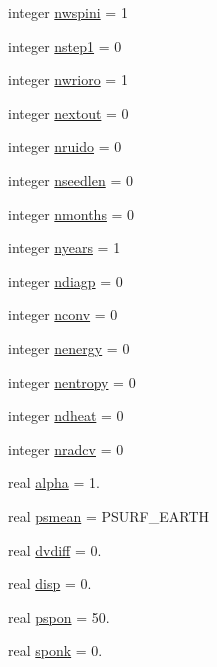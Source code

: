 \begin{DoxyCompactItemize}
\item 
integer \hyperlink{classpumamod_ae565fd4c9d0d1e8f563b457690df60e1}{nwspini} = 1
\item 
integer \hyperlink{classpumamod_a44f4e89edb1112fb56a0acd8fe2de68c}{nstep1} = 0
\item 
integer \hyperlink{classpumamod_aeed68a00c7949544bc4fef6fb12750e7}{nwrioro} = 1
\item 
integer \hyperlink{classpumamod_ac8490b47e54184cb4a1cea076d0a30a3}{nextout} = 0
\item 
integer \hyperlink{classpumamod_a8f8ac2af640bb3457498cf2ca2cf382a}{nruido} = 0
\item 
integer \hyperlink{classpumamod_af9d1e5f558a9b0151f81e27c4ea6c361}{nseedlen} = 0
\item 
integer \hyperlink{classpumamod_a5deccef8dbe1e1e9bfb869f67d8a16f1}{nmonths} = 0
\item 
integer \hyperlink{classpumamod_a6bebc837456862a7db9c50bcd686e1e6}{nyears} = 1
\item 
integer \hyperlink{classpumamod_a996f9145950ee7b3955819b122de4957}{ndiagp} = 0
\item 
integer \hyperlink{classpumamod_a4ad70fab2e818be277ec41afde36c5d2}{nconv} = 0
\item 
integer \hyperlink{classpumamod_a0423d8412d0d82630764dd724fbe763a}{nenergy} = 0
\item 
integer \hyperlink{classpumamod_a6ebc03f03149556f450c2c2c927189f2}{nentropy} = 0
\item 
integer \hyperlink{classpumamod_a8e7c1d42543d35f7caba5ebd36dcfd54}{ndheat} = 0
\item 
integer \hyperlink{classpumamod_a5e7e19a6f3a971a303fc7efc2676e5f1}{nradcv} = 0
\item 
real \hyperlink{classpumamod_a976863e22669d1d80cb62a3af35e3d4d}{alpha} = 1.
\item 
real \hyperlink{classpumamod_ac68939034981424cca40dd948549d1a0}{psmean} = \-P\-S\-U\-R\-F\-\_\-\-E\-A\-R\-T\-H
\item 
real \hyperlink{classpumamod_a529184e9404faf138c07e7f28afee2e1}{dvdiff} = 0.
\item 
real \hyperlink{classpumamod_a4fc16343d9407e3714e301309177a08a}{disp} = 0.
\item 
real \hyperlink{classpumamod_a594702993f401d2641f71890a8f9f6f5}{pspon} = 50.
\item 
real \hyperlink{classpumamod_ad1a6236311cdfb3949ec1b1c262b59ac}{sponk} = 0.
\item 

\end{DoxyCompactItemize}
